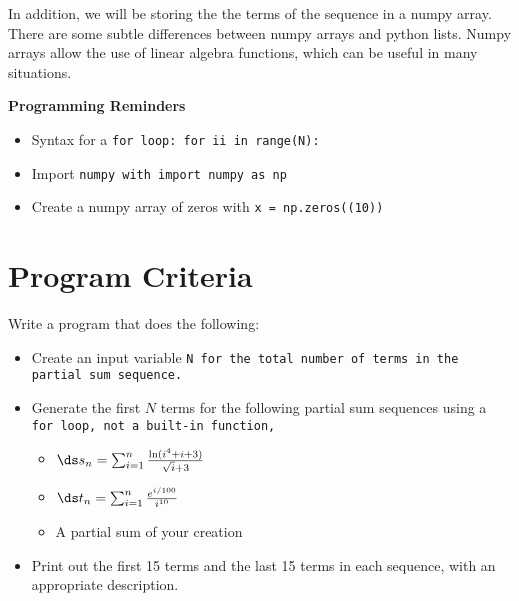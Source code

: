 \documentclass{article}
\def\prog#1{
\vspace{.1in}\begin{mdframed} \begin{center} \textbf{Programming Reminders} \end{center}#1 \end{mdframed} }
\begin{document}
	In addition, we will be storing the the terms of the sequence in a numpy array.  There are some subtle differences between numpy arrays and python lists.  Numpy arrays allow the use of linear algebra functions, which can be useful in many situations.
	\prog{
		\begin{itemize}
			\item Syntax for a \tt{for} loop: \tt{for ii in range(N):}
			\item Import \tt{numpy} with \tt{import numpy as np}
			\item Create a numpy array of zeros with \tt{x = np.zeros((10))}
		\end{itemize}
		}




\section*{Program Criteria}
	Write a program that does the following:
	\begin{itemize}
		\item Create an input variable \tt{N} for the total number of terms in the partial sum sequence.
		\item Generate the first $N$ terms for the following partial sum sequences using a \tt{for} loop, not a built-in function,
		\begin{itemize}
			\item $\ds s_n = \sum_{i=1}^n \frac{\ln(i^4 +i+3)}{\sqrt{i}+3}$
			\item $\ds t_n = \sum_{i=1}^n \frac{e^{i/100}}{i^{10}}$
			\item A partial sum of your creation
		\end{itemize}
		\item Print out the first 15 terms and the last 15 terms in each sequence, with an appropriate description.
	\end{itemize}







\end{document}
